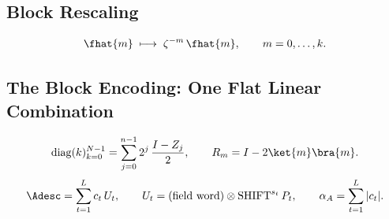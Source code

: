 \subsection{Block Rescaling}
\label{sec:descriptor-rescaling}

\begin{equation}
    \fhat{m} \;\longmapsto\; \zeta^{-m}\,\fhat{m},
    \qquad m = 0, \dots, k .
    \label{eq:block-rescaling}
\end{equation}

\subsection{The Block Encoding: One Flat Linear Combination}
\label{sec:descriptor-block-encoding}

\begin{equation}
    \operatorname{diag}(k)_{k=0}^{N-1} = \sum_{j=0}^{n-1} 2^{j}\,\frac{I - Z_j}{2},
    \qquad
    R_m = I - 2\ket{m}\bra{m} .
    \label{eq:diag-index}
\end{equation}
\begin{equation}
    \Adesc = \sum_{t=1}^{L} c_t\,U_t,
    \qquad
    U_t = (\text{field word}) \otimes \mathrm{SHIFT}^{s_t}\,P_t,
    \qquad
    \alpha_A = \sum_{t=1}^{L} |c_t| .
    \label{eq:descriptor-lcu}
\end{equation}

